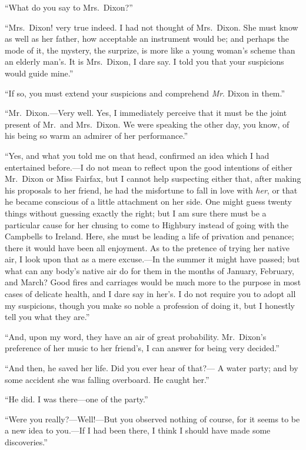 ``What do you say to Mrs.\ Dixon?''

``Mrs.\ Dixon! very true indeed.  I had not thought of Mrs.\ Dixon.
She must know as well as her father, how acceptable an instrument
would be; and perhaps the mode of it, the mystery, the surprize,
is more like a young woman's scheme than an elderly man's. It
is Mrs.\ Dixon, I dare say.  I told you that your suspicions would
guide mine.''

``If so, you must extend your suspicions and comprehend \emph{Mr}. Dixon
in them.''

``Mr.\ Dixon.---Very well.  Yes, I immediately perceive that it must
be the joint present of Mr.\ and Mrs.\ Dixon.  We were speaking the
other day, you know, of his being so warm an admirer of her performance.''

``Yes, and what you told me on that head, confirmed an idea which I
had entertained before.---I do not mean to reflect upon the good
intentions of either Mr.\ Dixon or Miss Fairfax, but I cannot help
suspecting either that, after making his proposals to her friend,
he had the misfortune to fall in love with \emph{her}, or that he became
conscious of a little attachment on her side.  One might guess
twenty things without guessing exactly the right; but I am sure
there must be a particular cause for her chusing to come to Highbury
instead of going with the Campbells to Ireland.  Here, she must be
leading a life of privation and penance; there it would have been
all enjoyment.  As to the pretence of trying her native air, I look
upon that as a mere excuse.---In the summer it might have passed;
but what can any body's native air do for them in the months
of January, February, and March?  Good fires and carriages would
be much more to the purpose in most cases of delicate health, and I
dare say in her's. I do not require you to adopt all my suspicions,
though you make so noble a profession of doing it, but I honestly
tell you what they are.''

``And, upon my word, they have an air of great probability.
Mr.\ Dixon's preference of her music to her friend's, I can answer
for being very decided.''

``And then, he saved her life.  Did you ever hear of that?---%
A water party; and by some accident she was falling overboard.
He caught her.''

``He did.  I was there---one of the party.''

``Were you really?---Well!---But you observed nothing of course,
for it seems to be a new idea to you.---If I had been there, I think
I should have made some discoveries.''

